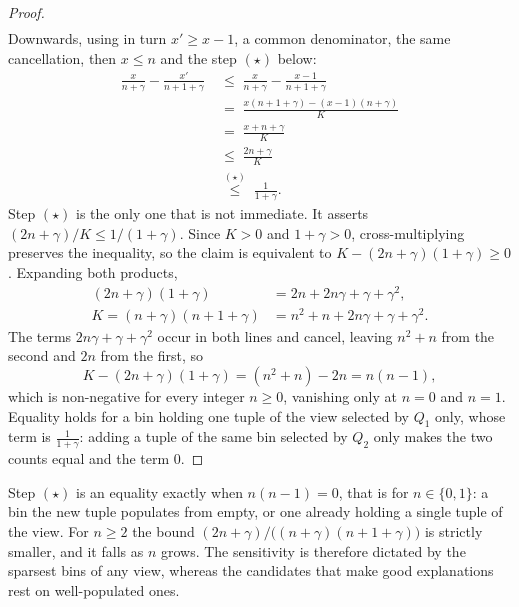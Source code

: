 \begin{proof}
\begin{align*}
\end{align*}
Downwards, using in turn $x'\ge x-1$, a common denominator, the same cancellation, then $x\le n$ and the step $(\star)$ below:
\begin{align*}
\frac{x}{n+\gamma}-\frac{x'}{n+1+\gamma}
&\;\le\;\frac{x}{n+\gamma}-\frac{x-1}{n+1+\gamma}\\[2pt]
&\;=\;\frac{x(n+1+\gamma)-(x-1)(n+\gamma)}{K}\\[2pt]
&\;=\;\frac{x+n+\gamma}{K}\\[2pt]
&\;\le\;\frac{2n+\gamma}{K}\\[2pt]
&\;\overset{(\star)}{\le}\;\frac{1}{1+\gamma}.
\end{align*}
Step $(\star)$ is the only one that is not immediate.
It asserts $(2n+\gamma)/K\le 1/(1+\gamma)$.
Since $K>0$ and $1+\gamma>0$, cross-multiplying preserves the inequality, so the claim is equivalent to $K-(2n+\gamma)(1+\gamma)\ge0$.
Expanding both products,
\begin{align*}
(2n+\gamma)(1+\gamma)&=2n+2n\gamma+\gamma+\gamma^2,\\[2pt]
K=(n+\gamma)(n+1+\gamma)&=n^2+n+2n\gamma+\gamma+\gamma^2 .
\end{align*}
The terms $2n\gamma+\gamma+\gamma^2$ occur in both lines and cancel, leaving $n^2+n$ from the second and $2n$ from the first, so
\[
K-(2n+\gamma)(1+\gamma)=(n^2+n)-2n=n(n-1),
\]
which is non-negative for every integer $n\ge0$, vanishing only at $n=0$ and $n=1$.
Equality holds for a bin holding one tuple of the view selected by $Q_1$ only, whose term is $\frac{1}{1+\gamma}$: adding a tuple of the same bin selected by $Q_2$ only makes the two counts equal and the term $0$.
\end{proof}

Step $(\star)$ is an equality exactly when $n(n-1)=0$, that is for $n\in\{0,1\}$: a bin the new tuple populates from empty, or one already holding a single tuple of the view.
For $n\ge2$ the bound $(2n+\gamma)/\big((n+\gamma)(n+1+\gamma)\big)$ is strictly smaller, and it falls as $n$ grows.
The sensitivity is therefore dictated by the sparsest bins of any view, whereas the candidates that make good explanations rest on well-populated ones.


\begin{lemma}
\label{lem:usefulness}
\added{Let $\gamma_R=\alpha N$ for a public $\alpha\in(0,1]$, as in Eq.~\eqref{eq:gammaR-rule}.
Then, for every $N\ge1/\alpha$,
\[ \Delta_{\Use}(N)\;\le\;\frac{4}{N}. \]}
\end{lemma}

